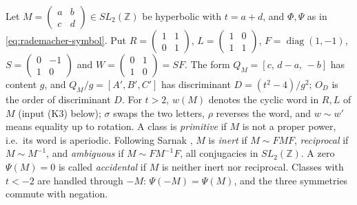 \documentclass[11pt]{article}
\theoremstyle{definition}
\newcommand{\Z}{\mathbb Z}
\begin{document}
Let $M=\begin{pmatrix}a&b\\c&d\end{pmatrix}\in SL_2(\Z)$ be hyperbolic
with $t=a+d$, and $\Phi,\Psi$ as in \eqref{eq:rademacher-symbol}.  Put
$R=\begin{pmatrix}1&1\\0&1\end{pmatrix}$,
$L=\begin{pmatrix}1&0\\1&1\end{pmatrix}$, $F=\operatorname{diag}(1,-1)$,
$S=\begin{pmatrix}0&-1\\1&0\end{pmatrix}$ and
$W=\begin{pmatrix}0&1\\1&0\end{pmatrix}=SF$.  The form
$Q_M=[c,\,d-a,\,-b]$ has content $g$, and $Q_M/g=[A',B',C']$ has
discriminant $D=(t^2-4)/g^2$; $O_D$ is the order of discriminant $D$.
For $t>2$, $w(M)$ denotes the cyclic word in $R,L$ of $M$ (input (K3)
below); $\sigma$ swaps the two letters, $\rho$ reverses the word, and
$w\sim w'$ means equality up to rotation.  A class is \emph{primitive}
if $M$ is not a proper power, i.e.\ its word is aperiodic.  Following
Sarnak \cite{Sarnak2007}, $M$ is \emph{inert} if $M\sim FMF$,
\emph{reciprocal} if $M\sim M^{-1}$, and \emph{ambiguous} if
$M\sim FM^{-1}F$, all conjugacies in $SL_2(\Z)$.  A zero $\Psi(M)=0$ is
called \emph{accidental} if $M$ is neither inert nor reciprocal.  Classes
with $t<-2$ are handled through $-M$: $\Psi(-M)=\Psi(M)$, and the three
symmetries commute with negation.
\end{document}
